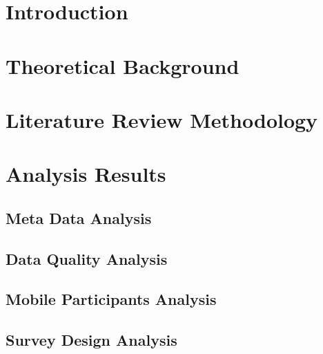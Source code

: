\documentclass[12pt,a4paper]{article}
\begin{document}
\newpage



\section{Introduction}
\label{01_introduction}


\section{Theoretical Background}
\label{02_theoretical_background}


\section{Literature Review Methodology}
\label{03_literature_review_methodology}


\section{Analysis Results}
\label{04_analysis_results}

\subsection{Meta Data Analysis}
\label{04_01_meta_data_analysis}


\subsection{Data Quality Analysis}
\label{04_02_data_quality_analysis}


\subsection{Mobile Participants Analysis}
\label{04_03_mobile_participants_analysis}


\subsection{Survey Design Analysis}
\label{04_04_survey_design_analysis}

\end{document}
